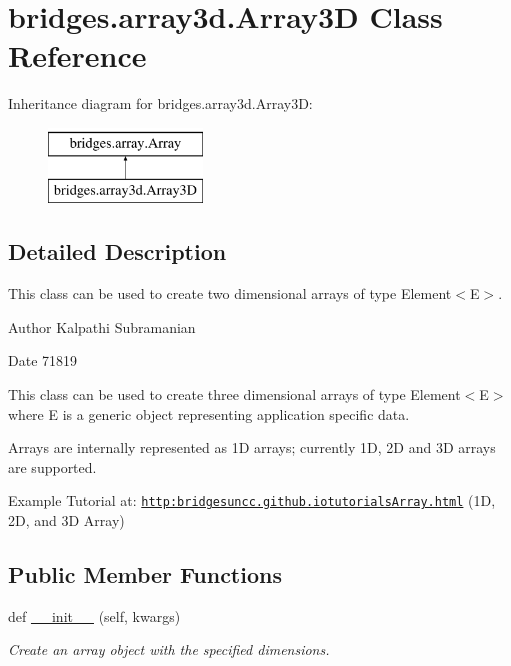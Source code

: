 \hypertarget{classbridges_1_1array3d_1_1_array3_d}{}\section{bridges.\+array3d.\+Array3D Class Reference}
\label{classbridges_1_1array3d_1_1_array3_d}
Inheritance diagram for bridges.\+array3d.\+Array3D\+:\begin{figure}[H]
\begin{center}
\leavevmode
\includegraphics[height=2.000000cm]{classbridges_1_1array3d_1_1_array3_d}
\end{center}
\end{figure}


\subsection{Detailed Description}
This class can be used to create two dimensional arrays of type Element$<$\+E$>$. 

\begin{DoxyAuthor}{Author}
Kalpathi Subramanian
\end{DoxyAuthor}
\begin{DoxyDate}{Date}
71819
\end{DoxyDate}
This class can be used to create three dimensional arrays of type Element$<$\+E$>$ where E is a generic object representing application specific data.

Arrays are internally represented as 1D arrays; currently 1D, 2D and 3D arrays are supported.

Example Tutorial at\+: \href{http:bridgesuncc.github.iotutorialsArray.html}{\tt http\+:bridgesuncc.\+github.\+iotutorials\+Array.\+html} (1D, 2D, and 3D Array)~\newline
 \subsection*{Public Member Functions}
\begin{DoxyCompactItemize}
\item 
def \mbox{\hyperlink{classbridges_1_1array3d_1_1_array3_d_a2ab3261c784068e2b4fdf388a972b1e3}{\+\_\+\+\_\+init\+\_\+\+\_\+}} (self, kwargs)
\begin{DoxyCompactList}\small\item\em Create an array object with the specified dimensions. \end{DoxyCompactList}\end{DoxyCompactItemize}
